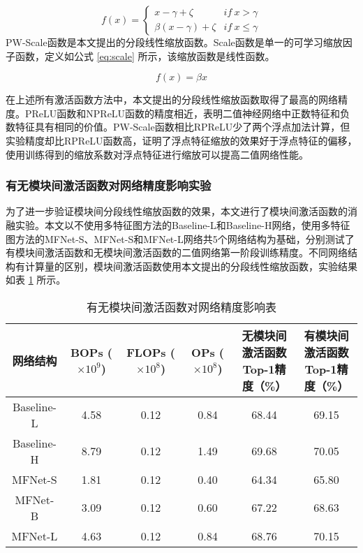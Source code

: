 \begin{equation}
  \label{eq:rprelu}
  f(x) =
  \begin{cases}
    x - \gamma + \zeta  & if \ x > \gamma  \\
    \beta (x - \gamma) + \zeta  & if \ x \leq \gamma 
  \end{cases}
\end{equation}
PW-Scale函数是本文提出的分段线性缩放函数。Scale函数是单一的可学习缩放因子函数，定义如公式 \eqref{eq:scale} 所示，该缩放函数是线性函数。

\begin{equation}
  \label{eq:scale}
  f(x) = \beta x
\end{equation}

在上述所有激活函数方法中，本文提出的分段线性缩放函数取得了最高的网络精度。PReLU函数和NPReLU函数的精度相近，表明二值神经网络中正数特征和负数特征具有相同的价值。PW-Scale函数相比RPReLU少了两个浮点加法计算，但实验精度却比RPReLU函数高，证明了浮点特征缩放的效果好于浮点特征的偏移，使用训练得到的缩放系数对浮点特征进行缩放可以提高二值网络性能。

\subsubsection{有无模块间激活函数对网络精度影响实验}

为了进一步验证模块间分段线性缩放函数的效果，本文进行了模块间激活函数的消融实验。本文以不使用多特征图方法的Baseline-L和Baseline-H网络，使用多特征图方法的MFNet-S、MFNet-S和MFNet-L网络共5个网络结构为基础，分别测试了有模块间激活函数和无模块间激活函数的二值网络第一阶段训练精度。不同网络结构有计算量的区别，模块间激活函数使用本文提出的分段线性缩放函数，实验结果如表 \ref{tab:44} 所示。

\begin{table}[htb]
  \vspace{6pt}
  \centering
  \caption{有无模块间激活函数对网络精度影响表}
  \label{tab:44}
  \begin{tabular}{cccccc}
    \toprule
    网络结构 & \makecell{BOPs\\($\times10^9$)} & \makecell{FLOPs\\($\times10^8$)} & \makecell{OPs\\($\times10^8$)} & \makecell{无模块间激活函数\\Top-1精度（\%）} & \makecell{有模块间激活函数\\Top-1精度（\%）} \\
    \midrule
    Baseline-L & 4.58 & 0.12 & 0.84 & 68.44 & 69.15 \\
    Baseline-H & 8.79 & 0.12 & 1.49 & 69.68 & 70.05 \\
    MFNet-S    & 1.81 & 0.12 & 0.40 & 64.34 & 65.80 \\
    MFNet-B    & 3.09 & 0.12 & 0.60 & 67.22 & 68.63 \\
    MFNet-L    & 4.63 & 0.12 & 0.84 & 68.76 & 70.15 \\
    \bottomrule
  \end{tabular}
  \vspace{6pt}
\end{table}

